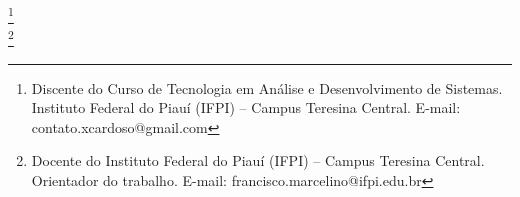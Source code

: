 
\imprimircapa

\imprimirfolhaderosto*

%



%

%


\begin{center}
    {\ABNTEXchapterfont\bfseries\MakeUppercase{\imprimirtitulo}}
\end{center}

\vspace{0.3cm} %

\flushright 
\autornomecompleto\footnote{Discente do Curso de Tecnologia em Análise e Desenvolvimento de Sistemas. Instituto Federal do Piauí (IFPI) -- Campus Teresina Central. E-mail: contato.xcardoso@gmail.com} \\
\profnomecompleto\footnote{Docente do Instituto Federal do Piauí (IFPI) -- Campus Teresina Central. Orientador do trabalho. E-mail: francisco.marcelino@ifpi.edu.br} \par 

\vspace{0.4cm} %

\justifying 



\newpage



